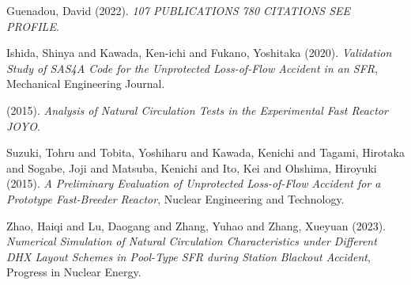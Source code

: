\documentclass[11pt]{article}
\begin{document}
\noindent
Guenadou, David (2022). \emph{107 {{PUBLICATIONS}} 780 {{CITATIONS SEE PROFILE}}}.

\noindent
Ishida, Shinya and Kawada, Ken-ichi and Fukano, Yoshitaka (2020). \emph{Validation Study of {{SAS4A}} Code for the Unprotected Loss-of-Flow Accident in an {{SFR}}}, Mechanical Engineering Journal.

\noindent
 (2015). \emph{Analysis of {{Natural Circulation Tests}} in the {{Experimental Fast Reactor JOYO}}}.

\noindent
Suzuki, Tohru and Tobita, Yoshiharu and Kawada, Kenichi and Tagami, Hirotaka and Sogabe, Joji and Matsuba, Kenichi and Ito, Kei and Ohshima, Hiroyuki (2015). \emph{A Preliminary Evaluation of Unprotected Loss-of-Flow Accident for a Prototype Fast-Breeder Reactor}, Nuclear Engineering and Technology.

\noindent
Zhao, Haiqi and Lu, Daogang and Zhang, Yuhao and Zhang, Xueyuan (2023). \emph{Numerical Simulation of Natural Circulation Characteristics under Different {{DHX}} Layout Schemes in Pool-Type {{SFR}} during Station Blackout Accident}, Progress in Nuclear Energy.


\end{document}
